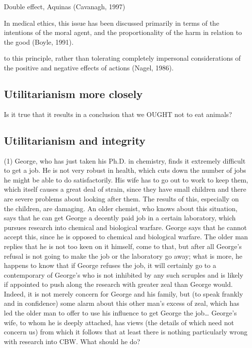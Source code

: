 \documentclass[12pt]{report}
\numberwithin{equation}{section}
\begin{document}


Double effect, Aquinas (Cavanagh, 1997)

In medical ethics, this issue has been discussed primarily in
terms of the intentions of the moral agent, and the proportionality of the harm in relation to the good (Boyle, 1991).

to this principle, rather than
tolerating completely impersonal considerations of the positive
and negative effects of actions (Nagel, 1986).

\subsection{Utilitarianism more closely}

Is it true that it results in a conclusion that we OUGHT not to eat animals?  


\subsection{Utilitarianism and integrity}

(1) George, who has just taken his Ph.D. in chemistry, finds it extremely difficult
to get a job. He is not very robust in health, which cuts down the number of jobs
he might be able to do satisfactorily. His wife has to go out to work to keep
them, which itself causes a great deal of strain, since they have small children
and there are severe problems about looking after them. The results of this,
especially on the children, are damaging. An older chemist, who knows about
this situation, says that he can get George a decently paid job in a certain
laboratory, which pursues research into chemical and biological warfare. George
says that he cannot accept this, since he is opposed to chemical and biological
warfare. The older man replies that he is not too keen on it himself, come to that,
but after all George’s refusal is not going to make the job or the laboratory go away;
what is more, he happens to know that if George refuses the job, it will certainly
go to a contemporary of George’s who is not inhibited by any such scruples and
is likely if appointed to push along the research with greater zeal than George
would. Indeed, it is not merely concern for George and his family, but (to speak
frankly and in confidence) some alarm about this other man’s excess of zeal,
which has led the older man to offer to use his influence to get George the job…
George’s wife, to whom he is deeply attached, has views (the details of which
need not concern us) from which it follows that at least there is nothing
particularly wrong with research into CBW. What should he do?
\end{document}
